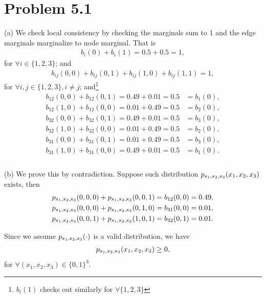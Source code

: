 \documentclass{article}
\newcommand{\s}[1]{\textsf{\textit{#1}}}
\newcommand{\qeds}{\hfill\qedsymbol}
\begin{document}
\section*{Problem 5.1}
%
(a) We check local consistency by checking the marginals sum to 1 and the
edge marginals marginalize to node marginal. That is
%
\begin{align*}
	b_i(0) + b_i(1) = 0.5 + 0.5 = 1,
\end{align*}
%
for $\forall i \in \{1, 2, 3\}$; and
\begin{align*}
	b_{ij}(0,0) + b_{ij}(0,1) + b_{ij}(1,0) + b_{ij}(1,1) = 1,
\end{align*}
%
for $\forall i, j \in \{1, 2, 3\}, i \neq j$;
and\footnote{$b_i(1)$ checks out similarly for $\forall \{1,2,3\}$}
%
\begin{align*}
	b_{12}(0, 0) + b_{12}(0, 1) = 0.49 + 0.01 = 0.5 &= b_1(0),\\
	b_{12}(1, 0) + b_{12}(0, 0) = 0.01 + 0.49 = 0.5 &= b_2(0),\\
	b_{32}(0, 0) + b_{32}(0, 1) = 0.49 + 0.01 = 0.5 &= b_3(0),\\
	b_{32}(1, 0) + b_{32}(0, 0) = 0.01 + 0.49 = 0.5 &= b_2(0),\\
	b_{31}(0, 0) + b_{31}(0, 1) = 0.01 + 0.49 = 0.5 &= b_3(0),\\
	b_{31}(1, 0) + b_{31}(0, 0) = 0.49 + 0.01 = 0.5 &= b_1(0).\\
\end{align*} \qeds
%
\\

\noindent
(b) We prove this by contradiction. Suppose such distribution
$p_{\s{x}_1, \s{x}_2, \s{x}_3}(x_1, x_2, x_3)$ exists, then
\begin{align}
	&p_{\s{x}_1, \s{x}_2, \s{x}_3}(0, 0, 0) + p_{\s{x}_1, \s{x}_2, \s{x}_3}(0, 0, 1) = b_{12}(0, 0) = 0.49, \label{51b1}\\
	&p_{\s{x}_1, \s{x}_2, \s{x}_3}(0, 0, 0) + p_{\s{x}_1, \s{x}_2, \s{x}_3}(0, 1, 0) = b_{31}(0, 0) = 0.01, \label{51b2}\\
	&p_{\s{x}_1, \s{x}_2, \s{x}_3}(0, 0, 1) + p_{\s{x}_1, \s{x}_2, \s{x}_3}(1, 0, 1) = b_{32}(0, 1) = 0.01. \label{51b3}
\end{align}
%

Since we assume $p_{\s{x}_1, \s{x}_2, \s{x}_3}(\cdot)$ is a valid distribution, we have
\begin{align*}
	p_{\s{x}_1, \s{x}_2, \s{x}_3}(x_1, x_2, x_3) \geq 0,
\end{align*}
for $\forall (x_1, x_2, x_3) \in \{0, 1\}^3$.
\end{document}
